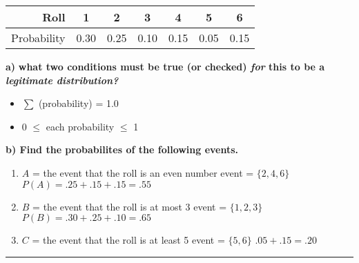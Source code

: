 \documentclass{report}
\begin{document}
\begin{center}
\begin{tabular}{r|cccccc} 
Roll & 1 & 2 & 3 & 4 & 5 & 6 \\
\hline Probability & 0.30 & 0.25 & 0.10 & 0.15 & 0.05 & 0.15
\end{tabular}
\end{center}
\bigbreak \noindent 
\textbf{a)} \textbf{what two conditions must be true (or checked) \textit{for} this to be a \textit{legitimate distribution?}}
\begin{itemize}
  \item $\sum$ (probability) = 1.0
  \item 0 $\le$ each probability $\le$ 1
  
\end{itemize}
\bigbreak \bigbreak \noindent
\textbf{b) Find the probabilites of the following events.}
\begin{enumerate}
  \item $A$ = the event that the roll is an even number
    \subitem event = $\{2,4,6\}$ \hspace{5mm} $P(A) = .25 + .15 + .15 = .55$
  \item $B$ = the event that the roll is at most 3
    \subitem event = $\{1,2,3\}$ \hspace{5mm} $P(B) = .30+.25+.10 = .65$
  \item $C$ = the event that the roll is at least 5
    \subitem event = $\{5,6\}$\hspace{5mm} $.05 +  .15 = .20$
\end{enumerate}
\bigbreak \bigbreak \noindent
\hrule
\end{document}

